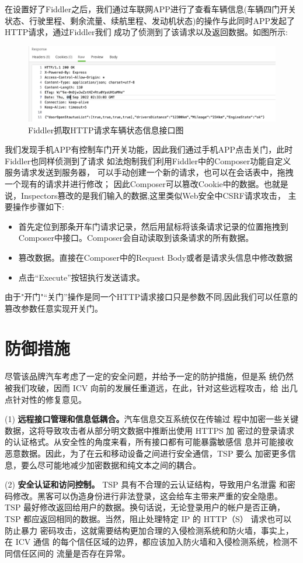 在设置好了Fiddler之后，我们通过车联网APP进行了查看车辆信息(车辆四门开关状态、行驶里程、剩余流量、续航里程、发动机状态)的操作与此同时APP发起了HTTP请求，通过Fiddler我们
成功了侦测到了该请求以及返回数据。如图所示:
\begin{figure}
  \centering
  \includegraphics[scale=0.5]{resources/img/i26.png}
  \caption{Fiddler抓取HTTP请求车辆状态信息接口图}
\end{figure}
我们发现手机APP有控制车门开关功能，因此我们通过手机APP点击关门，此时Fiddler也同样侦测到了请求
如法炮制我们利用Fiddler中的Composer功能自定义服务请求发送到服务器，
可以手动创建一个新的请求，也可以在会话表中，拖拽一个现有的请求并进行修改；
因此Composer可以篡改Cookie中的数据。也就是说，Inspectors篡改的是我们输入的数据,这里类似Web安全中CSRF请求攻击\cite{blatz2007csrf}，
主要操作步骤如下:
\begin{itemize}
  \item 首先定位到那条开车门请求记录，然后用鼠标将该条请求记录的位置拖拽到Composer中接口。Composer会自动读取到该条请求的所有数据。
  \item 篡改数据。直接在Composer中的Request Body或者是请求头信息中修改数据
  \item 点击“Execute”按钮执行发送请求。
\end{itemize}
由于"开门"“关门”操作是同一个HTTP请求接口只是参数不同,因此我们可以任意的篡改参数任意实现开关门。
\section{防御措施}
尽管该品牌汽车考虑了一定的安全问题，并给予一定的防护措施，但是系
统仍然被我们攻破，因而 ICV 向前的发展任重道远，在此，针对这些远程攻击，给
出几点针对性的修复意见。

(1) \textbf{远程接口管理和信息低耦合。}汽车信息交互系统仅在传输过
程中加密一些关键数据，这将导致攻击者从部分明文数据中推断出使用 HTTPS 加
密过的登录请求的认证格式。从安全性的角度来看，所有接口都有可能暴露敏感信
息并可能接收恶意数据。因此，为了在云和移动设备之间进行安全通信，TSP 要么
加密更多信息，要么尽可能地减少加密数据和纯文本之间的耦合。

(2) \textbf{安全认证和访问控制。} TSP 具有不合理的云认证结构，导致用户名泄露
和密码修改。黑客可以伪造身份进行非法登录，这会给车主带来严重的安全隐患。
TSP 最好修改返回给用户的数据。换句话说，无论登录用户的帐户是否正确，TSP
都应返回相同的数据。当然，阻止处理特定 IP 的 HTTP（S） 请求也可以防止暴力
密码攻击，这就需要结构更加合理的入侵检测系统和防火墙，事实上，在 ICV 通信
的每个信任区域的边界，都应该加入防火墙和入侵检测系统，检测不同信任区间的
流量是否存在异常。

